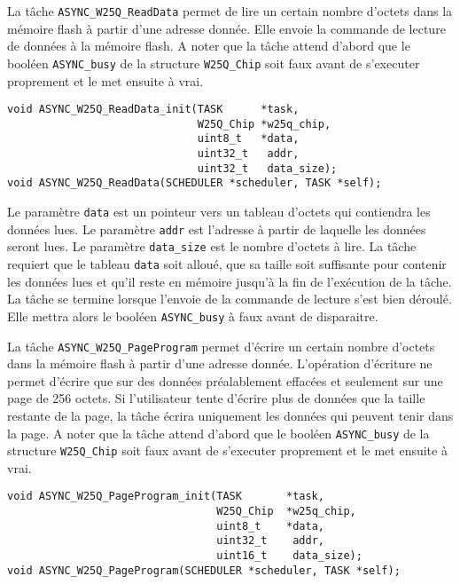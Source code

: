
La tâche \texttt{ASYNC\_W25Q\_ReadData} permet de lire un certain nombre d'octets
dans la mémoire flash à partir d'une adresse donnée. Elle envoie la commande de
lecture de données à la mémoire flash. A noter que la tâche attend d'abord que le
booléen \texttt{ASYNC\_busy} de la structure \texttt{W25Q\_Chip} soit faux avant de
s'executer proprement et le met ensuite à vrai.

\begin{lstlisting}[style=prog, frame=shadowbox, label={lst:ASYNC_W25Q_ReadData},
    emph={[1]ASYNC_W25Q_ReadData_init, ASYNC_W25Q_ReadData}, emphstyle={[1]\color{C}},
    emph={[2]W25Q_Chip, SCHEDULER, TASK}, emphstyle={[2]\color{E}}]
void ASYNC_W25Q_ReadData_init(TASK      *task,
                              W25Q_Chip *w25q_chip,
                              uint8_t   *data,
                              uint32_t   addr,
                              uint32_t   data_size);
void ASYNC_W25Q_ReadData(SCHEDULER *scheduler, TASK *self);
\end{lstlisting}

Le paramètre \texttt{data} est un pointeur vers un tableau d'octets qui contiendra
les données lues. Le paramètre \texttt{addr} est l'adresse à partir de laquelle les
données seront lues. Le paramètre \texttt{data\_size} est le nombre d'octets à lire.
La tâche requiert que le tableau \texttt{data} soit alloué, que sa taille soit
suffisante pour contenir les données lues et qu'il reste en mémoire jusqu'à la fin
de l'exécution de la tâche. La tâche se termine lorsque l'envoie de la commande de lecture s'est bien déroulé.
Elle mettra alors le booléen \texttt{ASYNC\_busy} à faux avant de disparaitre.



La tâche \texttt{ASYNC\_W25Q\_PageProgram} permet d'écrire un certain nombre d'octets
dans la mémoire flash à partir d'une adresse donnée. L'opération d'écriture ne permet
d'écrire que sur des données préalablement effacées et seulement sur une page de 256
octets. Si l'utilisateur tente d'écrire plus de données que la taille restante de la
page, la tâche écrira uniquement les données qui peuvent tenir dans la page. A noter
que la tâche attend d'abord que le booléen \texttt{ASYNC\_busy} de la structure
\texttt{W25Q\_Chip} soit faux avant de s'executer proprement et le met ensuite à vrai.

\begin{lstlisting}[style=prog, frame=shadowbox, label={lst:ASYNC_W25Q_PageProgram},
    emph={[1]ASYNC_W25Q_PageProgram_init, ASYNC_W25Q_PageProgram}, emphstyle={[1]\color{C}},
    emph={[2]W25Q_Chip, SCHEDULER, TASK}, emphstyle={[2]\color{E}}]
void ASYNC_W25Q_PageProgram_init(TASK       *task,
                                 W25Q_Chip  *w25q_chip,
                                 uint8_t    *data,
                                 uint32_t    addr,
                                 uint16_t    data_size);
void ASYNC_W25Q_PageProgram(SCHEDULER *scheduler, TASK *self);
\end{lstlisting}

